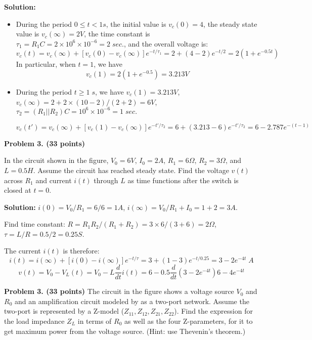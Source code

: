    {\bf Solution:}
   \begin{itemize}
   \item During the period $0\le t<1 s$, the initial value is 
  	$v_c(0)=4$, the steady state value is $v_c(\infty)=2V$, the time 
  	constant is $\tau_1=R_1C=2\times 10^6\times 10^{-6}=2\;sec.$, and 
  	the overall voltage is:
  \[ v_c(t)=v_c(\infty)+[v_c(0)-v_c(\infty)] e^{-t/\tau_1}
  	=2+(4-2) e^{-t/2}=2(1+e^{-0.5t})	\]
   In particular, when $t=1$, we have
   \[ v_c(1)=2(1+e^{-0.5})=3.213V	\]
   
   \item During the period $t \ge 1\;s$, we have $v_c(1)=3.213V$, 
   	$v_c(\infty)=2+2\times (10-2)/(2+2)=6V$,
   	$\tau_2=(R_1||R_2)C=10^6 \times 10^{-6}=1\; sec.$
  
   \[	v_c(t')=v_c(\infty)+[v_c(1)-v_c(\infty)]e^{-t'/\tau_2}
   	=6+(3.213-6)e^{-t'/\tau_2}=6-2.787e^{-(t-1)} \]
  
 \end{itemize}

\item {\bf Problem 3. (33 points)} 

In the circuit shown in the figure, $V_0=6V$, $I_0=2A$, $R_1=6\Omega$, 
$R_2=3\Omega$, and $L=0.5H$. Assume the circuit has reached steady state.
Find the voltage $v(t)$ across $R_1$ and current $i(t)$ through $L$ as 
time functions after the switch is closed at $t=0$.


{\bf Solution:} 
$i(0)=V_0/R_1=6/6=1A$, $i(\infty)=V_0/R_1+I_0=1+2=3A$. 

Find time constant: $R=R_1R_2/(R_1+R_2)=3\times 6/(3+6)=2\Omega$,
$\tau=L/R=0.5/2=0.25S$. 

The current $i(t)$ is therefore:
\[ i(t)=i(\infty)+[i(0)-i(\infty)]e^{-t/\tau}=3+(1-3)e^{-t/0.25}
	=3-2e^{-4t} \;A \]
\[ v(t)=V_0-V_L(t)=V_0-L\frac{d}{dt}i(t)=6-0.5 \frac{d}{dt}(3-2e^{-4t})
	6-4e^{-4t} \]


\item {\bf Problem 3. (33 points)} 
The circuit in the figure shows a voltage source $V_0$ and $R_0$ and an
amplification circuit modeled by as a two-port network. Assume the two-port 
is represented by a Z-model ($Z_{11}, Z_{12}, Z_{21}, Z_{22}$). Find the 
expression for the load impedance $Z_L$ in terms of $R_0$ as well as the
four Z-parameters, for it to get maximum power from the voltage source.
(Hint: use Thevenin's theorem.)


